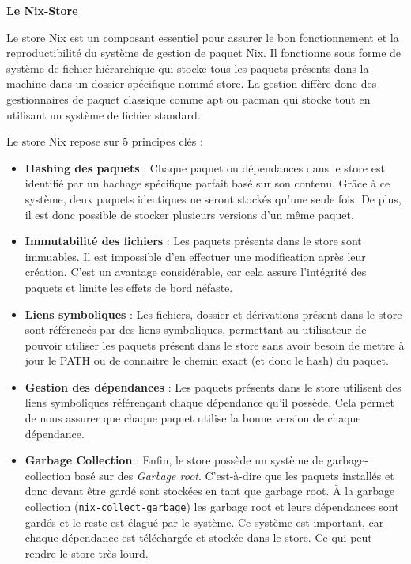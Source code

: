 \documentclass[a4paper,french,12pt, titlepage]{article}
\begin{document}
\textbf{Le Nix-Store}\newline

Le store Nix est un composant essentiel pour assurer le bon
fonctionnement et la reproductibilité du système de gestion de paquet
Nix. Il fonctionne sous forme de système de fichier hiérarchique qui
stocke tous les paquets présents dans la machine dans un dossier
spécifique nommé store. La gestion diffère donc des gestionnaires de
paquet classique comme apt ou pacman qui stocke tout en utilisant un
système de fichier standard.\newline

Le store Nix repose sur 5 principes clés :

\begin{itemize}
\item
  \textbf{Hashing des paquets} : Chaque paquet ou dépendances dans le
  store est identifié par un hachage spécifique parfait basé sur son
  contenu. Grâce à ce système, deux paquets identiques ne seront stockés
  qu'une seule fois. De plus, il est donc possible de stocker plusieurs
  versions d'un même paquet.
\item
  \textbf{Immutabilité des fichiers} : Les paquets présents dans le
  store sont immuables. Il est impossible d'en effectuer une
  modification après leur création. C'est un avantage considérable, car
  cela assure l'intégrité des paquets et limite les effets de bord
  néfaste.
\item
  \textbf{Liens symboliques} : Les fichiers, dossier et dérivations
  présent dans le store sont référencés par des liens symboliques,
  permettant au utilisateur de pouvoir utiliser les paquets présent dans
  le store sans avoir besoin de mettre à jour le PATH ou de connaitre le
  chemin exact (et donc le hash) du paquet.
\item
  \textbf{Gestion des dépendances} : Les paquets présents dans le store
  utilisent des liens symboliques référençant chaque dépendance qu'il
  possède. Cela permet de nous assurer que chaque paquet utilise la
  bonne version de chaque dépendance.
\item
  \textbf{Garbage Collection} : Enfin, le store possède un système de
  \gls{garbage-collection} basé sur des \emph{Garbage root}.
  C'est-à-dire que les paquets installés et donc devant être gardé sont
  stockées en tant que garbage root. À la garbage collection
  (\texttt{nix-collect-garbage}) les garbage root et leurs dépendances
  sont gardés et le reste est élagué par le système. Ce système est
  important, car chaque dépendance est téléchargée et stockée dans le
  store. Ce qui peut rendre le store très lourd.\newline
\end{itemize}
\end{document}
